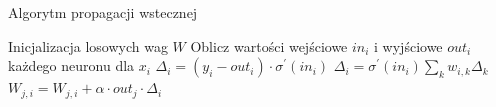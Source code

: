 \documentclass[12pt,a4paper,twoside]{article}
\begin{document}
\begin{algorithm}
\caption{Algorytm propagacji wstecznej}\label{alg:backpropagation}
  \begin{algorithmic}[1]
    \State Inicjalizacja losowych wag $W$
        \State Oblicz wartości wejściowe $in_i$ i wyjściowe $out_i$ każdego neuronu dla $x_i$
            \State $ \Delta_i = (y_i-out_i) \cdot \sigma^\prime(in_i) $
          \Else
            \State $ \Delta_i = \sigma^\prime(in_i)\sum_{k}w_{i,k}\Delta_k $
          \EndIf
          \State $ W_{j,i} = W_{j,i}+\alpha \cdot {out_j} \cdot \Delta_i $
        \EndFor
      \EndFor
    \EndFor
  \end{algorithmic}
\end{algorithm}
\end{document}
